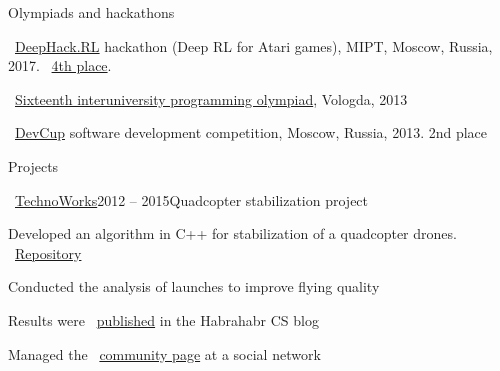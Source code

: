 \documentclass{resume} %
\begin{document}

\begin{rSection}{Olympiads and hackathons}
\item \faExternalLink~\href{http://web.archive.org/web/20170224094223/http://rl.deephack.me/}{DeepHack.RL} hackathon (Deep RL for Atari games), MIPT, Moscow, Russia, 2017. \faExternalLink~\href{https://github.com/sergeivolodin/deephack.rl}{4th place}.
\item \faExternalLink~\href{http://olympiads.vologda-uni.ru/interuni/}{Sixteenth interuniversity programming olympiad}, Vologda, 2013
\item \faExternalLink~\href{https://vk.com/devcup}{DevCup} software development competition, Moscow, Russia, 2013. 2nd place
\end{rSection}

\begin{rSection}{Projects}
	\begin{rSubsection}{\faExternalLink~\href{http://web.archive.org/web/20150626102512/http://technoworks.ru:80/}{TechnoWorks}}{2012 -- 2015}{Quadcopter stabilization project}{}
		\item Developed an algorithm in C++ for stabilization of a quadcopter drones. \faExternalLink~\href{https://github.com/it-workshop/Quadrocopter}{Repository}
		\item Conducted the analysis of launches to improve flying quality
		\item Results were \faExternalLink~\href{http://web.archive.org/web/20141016114551/http://habrahabr.ru/company/technoworks/blog/216437/}{published} in the Habrahabr CS blog
		\item Managed the \faExternalLink~\href{https://vk.com/technoworks}{community page} at a social network
	\end{rSubsection}
\end{rSection}
\end{document}
